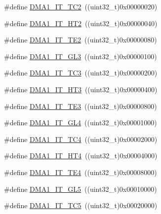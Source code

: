 \begin{DoxyCompactItemize}
\#define \mbox{\hyperlink{group___d_m_a__interrupts__definition_ga14171253268d69143102594cde56b0e1}{D\+M\+A1\+\_\+\+I\+T\+\_\+\+T\+C2}}~((uint32\+\_\+t)0x00000020)
\item 
\#define \mbox{\hyperlink{group___d_m_a__interrupts__definition_gab2d608582c350ed00412f7a09fe10ae7}{D\+M\+A1\+\_\+\+I\+T\+\_\+\+H\+T2}}~((uint32\+\_\+t)0x00000040)
\item 
\#define \mbox{\hyperlink{group___d_m_a__interrupts__definition_ga24e2ed429ff0c0b03c7fec8f4bc8bcc8}{D\+M\+A1\+\_\+\+I\+T\+\_\+\+T\+E2}}~((uint32\+\_\+t)0x00000080)
\item 
\#define \mbox{\hyperlink{group___d_m_a__interrupts__definition_ga3e71e661eb2ebab146b48b3aee5ad9b1}{D\+M\+A1\+\_\+\+I\+T\+\_\+\+G\+L3}}~((uint32\+\_\+t)0x00000100)
\item 
\#define \mbox{\hyperlink{group___d_m_a__interrupts__definition_ga37c375d4e3d681efecddc9f25c0c7bcd}{D\+M\+A1\+\_\+\+I\+T\+\_\+\+T\+C3}}~((uint32\+\_\+t)0x00000200)
\item 
\#define \mbox{\hyperlink{group___d_m_a__interrupts__definition_ga1e3b12ceb8ba5b8d129d5bdee21904de}{D\+M\+A1\+\_\+\+I\+T\+\_\+\+H\+T3}}~((uint32\+\_\+t)0x00000400)
\item 
\#define \mbox{\hyperlink{group___d_m_a__interrupts__definition_ga54e8f93512a446fcaf2b10cd92f81379}{D\+M\+A1\+\_\+\+I\+T\+\_\+\+T\+E3}}~((uint32\+\_\+t)0x00000800)
\item 
\#define \mbox{\hyperlink{group___d_m_a__interrupts__definition_ga24d5f98faba722d1ab54812ee7ad8eea}{D\+M\+A1\+\_\+\+I\+T\+\_\+\+G\+L4}}~((uint32\+\_\+t)0x00001000)
\item 
\#define \mbox{\hyperlink{group___d_m_a__interrupts__definition_ga4f6dd1c5092ca262f38c8bb8a7dc2986}{D\+M\+A1\+\_\+\+I\+T\+\_\+\+T\+C4}}~((uint32\+\_\+t)0x00002000)
\item 
\#define \mbox{\hyperlink{group___d_m_a__interrupts__definition_ga1e74c117ead07f4a8749e076316cf9d0}{D\+M\+A1\+\_\+\+I\+T\+\_\+\+H\+T4}}~((uint32\+\_\+t)0x00004000)
\item 
\#define \mbox{\hyperlink{group___d_m_a__interrupts__definition_ga48c3fecb70662a786f32d5cea0a894f8}{D\+M\+A1\+\_\+\+I\+T\+\_\+\+T\+E4}}~((uint32\+\_\+t)0x00008000)
\item 
\#define \mbox{\hyperlink{group___d_m_a__interrupts__definition_ga6a8d925c490ea6e7eaf9fbceea9774f6}{D\+M\+A1\+\_\+\+I\+T\+\_\+\+G\+L5}}~((uint32\+\_\+t)0x00010000)
\item 
\#define \mbox{\hyperlink{group___d_m_a__interrupts__definition_gaf916fe8154ad4a956eec66ecfe0e7e36}{D\+M\+A1\+\_\+\+I\+T\+\_\+\+T\+C5}}~((uint32\+\_\+t)0x00020000)

\end{DoxyCompactItemize}
